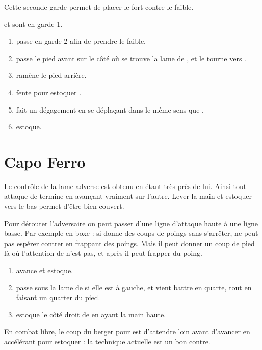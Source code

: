 Cette seconde garde permet de placer le fort contre le faible.


\begin{technique}
\A et \D sont en garde 1.

\begin{enumerate}
	\item \A passe en garde 2 afin de prendre le faible.
	\item \A passe le pied avant sur le côté où se trouve la lame de \D, et le tourne vers \D.
	\item \A ramène le pied arrière.
	\item \A fente pour estoquer \D.
	\item \D fait un dégagement en se déplaçant dans le même sens que \A.
	\item \D estoque.
\end{enumerate}

\end{technique}


\section{Capo Ferro}


Le contrôle de la lame adverse est obtenu en étant très près de lui.
Ainsi tout attaque de termine en avançant vraiment sur l'autre.
Lever la main et estoquer vers le bas permet d'être bien couvert.

Pour dérouter l'adversaire on peut passer d'une ligne d'attaque haute à une ligne basse.
Par exemple en boxe : si \A donne des coups de poings sans s'arrêter, \D ne peut pas espérer contrer en frappant des poings.
Mais il peut donner un coup de pied là où l'attention de \A n'est pas, et après il peut frapper du poing.


\begin{technique}

\begin{enumerate}
	\item \A avance et estoque.
	\item \D passe sous la lame de \D si elle est à gauche, et vient battre en quarte, tout en faisant un quarter du pied.
	\item \D estoque le côté droit de \A en ayant la main haute.
\end{enumerate}

En combat libre, le coup du berger pour \A est d'attendre loin avant d'avancer en accélérant pour estoquer : la technique actuelle est un bon contre.

\end{technique}


